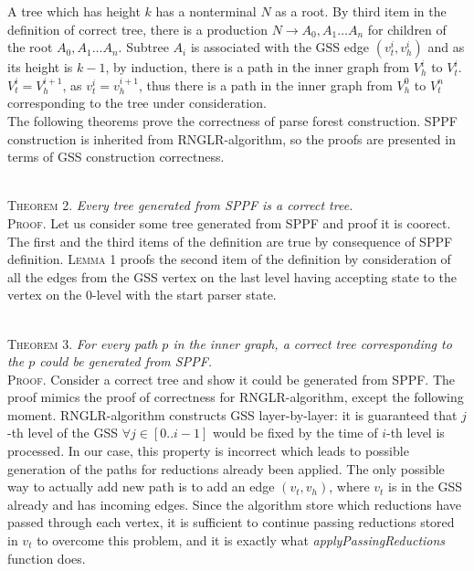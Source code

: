 A tree which has height $k$ has a nonterminal $N$ as a root. By third item in the definition of correct tree, 
there is a production $N \rightarrow A_{0}, A_{1} \dots A_{n}$ for children of the root $A_{0}, A_{1} \dots A_{n}$. 
Subtree $A_{i}$ is associated with the GSS edge $(v_{t}^{i}, v_{h}^{i})$ and as its height is $k-1$, by induction,
there is a path in the inner graph from $V_{h}^{i}$ to $V_{t}^{i}$. $V_{t}^i = V_{h}^{i+1}$, as $v_{t}^i = v_{h}^{i+1}$, 
thus there is a path in the inner graph from $V_{h}^{0}$ to $V_{t}^{n}$ corresponding to the tree under consideration.
~\\

The following theorems prove the correctness of parse forest construction. SPPF construction is inherited from 
RNGLR-algorithm, so the proofs are presented in terms of GSS construction correctness.

~\\
\textsc{Theorem 2.} 
\textit{Every tree generated from SPPF is a correct tree.}
~\\
\textsc{Proof.} Let us consider some tree generated from SPPF and proof it is coorect. 
The first and the third items of the definition are true by consequence of SPPF definition.
\textsc{Lemma 1} proofs the second item of the definition by consideration of all the edges from the GSS vertex
on the last level having accepting state to the vertex on the 0-level with the start parser state.

~\\
\textsc{Theorem 3.} 
\textit{For every path $p$ in the inner graph, a correct tree corresponding to the $p$ could be generated from SPPF.}
~\\
\textsc{Proof.}
Consider a correct tree and show it could be generated from SPPF. The proof mimics the proof of correctness for RNGLR-algorithm,
except the following moment. RNGLR-algorithm constructs GSS layer-by-layer: it is guaranteed that $j$-th level of the GSS 
$\forall j \in [0..i-1]$ would be fixed by the time of $i$-th level is processed. In our case, this property is incorrect 
which leads to possible generation of the paths for reductions already been applied. The only possible way to actually 
add new path is to add an edge $(v_{t}, v_{h})$, where $v_{t}$ is in the GSS already and has incoming edges.
Since the algorithm store which reductions have passed through each vertex, it is sufficient to continue passing 
reductions stored in $v_{t}$ to overcome this problem, and it is exactly what \emph{applyPassingReductions} function does. 